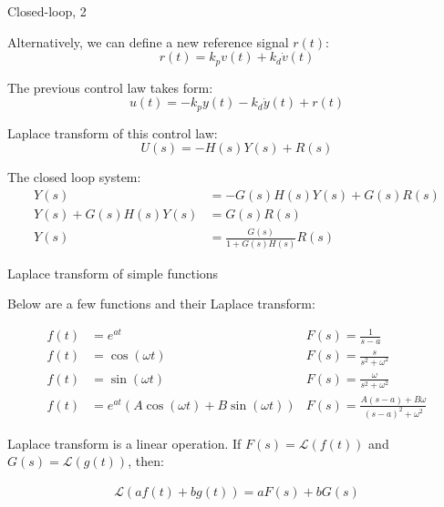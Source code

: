 \documentclass{beamer}
\begin{document}
\begin{frame}{Closed-loop, 2}
	\begin{flushleft}
		
		Alternatively, we can define a new reference signal $r(t)$:
		\begin{equation}
			r(t) = k_p v(t) + k_d \dot v(t)
		\end{equation}
		
		The previous control law takes form:
		\begin{equation}
			u(t) = -k_p y(t) - k_d \dot y(t) + r(t)
		\end{equation}
		
		Laplace transform of this control law:
		\begin{equation}
			U(s) = -H(s)Y(s) + R(s)
		\end{equation}
		
		The closed loop system:
		\begin{align}
			Y(s)  &= -G(s) H(s)Y(s) + G(s)R(s) \\
			Y(s) + G(s) H(s)Y(s)  &=  G(s)R(s)\\
			Y(s)  &= \frac{G(s)}{1 + G(s) H(s)} R(s) 
		\end{align}
		
		
	\end{flushleft}
\end{frame}




\begin{frame}{Laplace transform of simple functions}
	\begin{flushleft}
		
		Below are a few functions and their Laplace transform:
		
		\begin{align*}
			f(t) &= e^{at}  &F(s) = \frac{1}{s - a} \\
			f(t) &= \cos(\omega t) &F(s) = \frac{s}{s^2 + \omega^2} \\
			f(t) &= \sin(\omega t)  &F(s) = \frac{\omega}{s^2 + \omega^2}\\
			f(t) &= e^{at}(A \cos(\omega t) + B \sin(\omega t))  &F(s) = \frac{A (s- a) +  B\omega}{(s- a)^2 + \omega^2}
		\end{align*}
		
		Laplace transform is a linear operation. If $F(s) = \mathcal{L}(f(t))$ and $G(s) = \mathcal{L}(g(t))$, then:
		
		\begin{align}
			\mathcal{L}\left(a f(t) + b g(t)\right) = a F(s) + b G(s)
		\end{align}
		
		
		
	\end{flushleft}
\end{frame}
\end{document}
